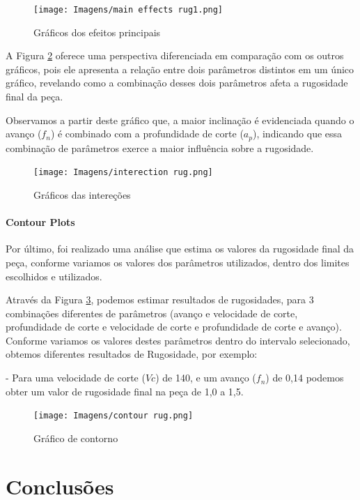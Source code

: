 \documentclass[deposito, acronym, symbols]{fei}
\begin{document}
\begin{figure}[!htp]
    \centering
    \caption{Gráficos dos efeitos principais}
    \texttt{[image: Imagens/main effects rug1.png]}
    \label{fig:rugme2}
\end{figure}

A Figura \ref{fig: rugint3} oferece uma perspectiva diferenciada em comparação com os outros gráficos, pois ele apresenta a relação entre dois parâmetros distintos em um único gráfico, revelando como a combinação desses dois parâmetros afeta a rugosidade final da peça.

Observamos a partir deste gráfico que, a maior inclinação é evidenciada quando o avanço ($f_n$) é combinado com a profundidade de corte ($a_p$), indicando que essa combinação de parâmetros exerce a maior influência sobre a rugosidade.

\begin{figure}[!htp]
    \centering
    \caption{Gráficos das intereções}
    \texttt{[image: Imagens/interection rug.png]}
    \label{fig: rugint3}
\end{figure}

\subsubsection{Contour Plots}

Por último, foi realizado uma análise que estima os valores da rugosidade final da peça, conforme variamos os valores dos parâmetros utilizados, dentro dos limites escolhidos e utilizados.

Através da Figura \ref{fig: rugcont}, podemos estimar resultados de rugosidades, para 3 combinações diferentes de parâmetros (avanço e velocidade de corte, profundidade de corte e velocidade de corte e profundidade de corte e avanço). Conforme variamos os valores destes parâmetros dentro do intervalo selecionado, obtemos diferentes resultados de Rugosidade, por exemplo: 

- Para uma velocidade de corte ($Vc$) de 140, e um avanço ($f_n$) de 0,14 podemos obter um valor de rugosidade final na peça de 1,0 a 1,5. 

\begin{figure}[!htp]
    \centering
    \caption{Gráfico de contorno}
    \texttt{[image: Imagens/contour rug.png]}
    \label{fig: rugcont}
\end{figure}

\chapter{Conclusões}
\end{document}
